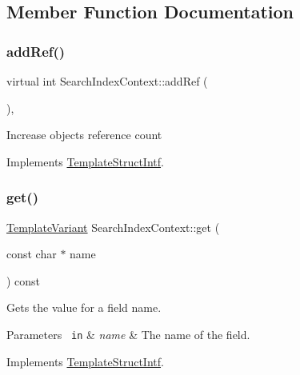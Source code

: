 \subsection{Member Function Documentation}
\mbox{\label{class_search_index_context_a81066a703e1ea1829a35631ee3dfbc1b}} 
\subsubsection{\texorpdfstring{addRef()}{addRef()}}
{\footnotesize\ttfamily virtual int Search\+Index\+Context\+::add\+Ref (\begin{DoxyParamCaption}{ }\end{DoxyParamCaption})\hspace{0.3cm}{\ttfamily [inline]}, {\ttfamily [virtual]}}

Increase object\textquotesingle{}s reference count 

Implements \mbox{\hyperlink{class_template_struct_intf_a05fe97ad47633beb326f69686faed581}{Template\+Struct\+Intf}}.

\mbox{\label{class_search_index_context_a41d9a31bc1f81dac3b586f36a5f32600}} 
\subsubsection{\texorpdfstring{get()}{get()}}
{\footnotesize\ttfamily \mbox{\hyperlink{class_template_variant}{Template\+Variant}} Search\+Index\+Context\+::get (\begin{DoxyParamCaption}\item[{const char $\ast$}]{name }\end{DoxyParamCaption}) const\hspace{0.3cm}{\ttfamily [virtual]}}

Gets the value for a field name. 
\begin{DoxyParams}[1]{Parameters}
\mbox{\texttt{ in}}  & {\em name} & The name of the field. \\
\hline
\end{DoxyParams}


Implements \mbox{\hyperlink{class_template_struct_intf_a3d610cb81b4adbb531ebed3aa3d09b51}{Template\+Struct\+Intf}}.

